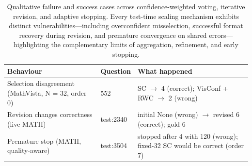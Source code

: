 \begin{table}[t]
\centering
\small
\caption{Qualitative failure and success cases across confidence-weighted voting, iterative revision, and adaptive stopping. Every test-time scaling mechanism exhibits distinct vulnerabilities—including overconfident misselection, successful format recovery during revision, and premature convergence on shared errors—highlighting the complementary limits of aggregation, refinement, and early stopping.}
\label{tab:t3-examples}
\begin{tabular}{ll>{\raggedright\arraybackslash}p{8.2cm}}
\toprule
Behaviour & Question & What happened \\
\midrule
Selection disagreement (MathVista, N = 32, order 0) & 552 & SC $\to$ 4 (correct); VisConf + RWC $\to$ 2 (wrong) \\
Revision changes correctness (live MATH) & test:2340 & initial None (wrong) $\to$ revised 6 (correct); gold 6 \\
Premature stop (MATH, quality-aware) & test:3504 & stopped after 4 with 120 (wrong); fixed-32 SC would be correct (order 7) \\
\bottomrule
\end{tabular}
\end{table}
